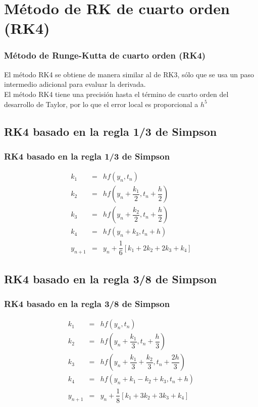 \section{M\'{e}todo de RK de cuarto orden (RK4)}
\begin{frame}
\frametitle{M\'{e}todo de Runge-Kutta de cuarto orden (RK4)}
El m\'{e}todo RK4 se obtiene de manera similar al de RK3, s\'{o}lo que se usa un paso intermedio adicional para evaluar la derivada.
\\
\medskip
El m\'{e}todo RK4 tiene una precisi\'{o}n hasta el t\'{e}rmino de cuarto orden del desarrollo de Taylor, por lo que el error local es proporcional a $h^{5}$
\end{frame}
\subsection{RK4 basado en la regla 1/3 de Simpson}
\begin{frame}
\frametitle{RK4 basado en la regla 1/3 de Simpson}
\begin{eqnarray*}
	k_{1} &=& hf(y_{n},t_{n}) \\
	k_{2} &=& hf(y_{n}+\dfrac{k_{1}}{2}, t_{n}+\dfrac{h}{2}) \\
	k_{3} &=& hf(y_{n}+\dfrac{k_{2}}{2},t_{n}+\dfrac{h}{2}) \\
	k_{4} &=& hf(y_{n}+k_{3}, t_{n}+h) \\
	y_{n+1} &=& y_{n}+\dfrac{1}{6}\left[k_{1}+2k_{2}+2k_{3}+k_{4} \right] 
\end{eqnarray*}
\end{frame}
\subsection{RK4 basado en la regla 3/8 de Simpson}
\begin{frame}
\frametitle{RK4 basado en la regla 3/8 de Simpson}
\begin{eqnarray*}
	k_{1} &=& hf(y_{n},t_{n}) \\
	k_{2} &=& hf(y_{n}+\dfrac{k_{1}}{3}, t_{n}+\dfrac{h}{3}) \\
	k_{3} &=& hf(y_{n}+\dfrac{k_{1}}{3}+\dfrac{k_{2}}{3},t_{n}+\dfrac{2h}{3}) \\
	k_{4} &=& hf(y_{n}+k_{1}-k_{2}+k_{3}, t_{n}+h) \\
	y_{n+1} &=& y_{n}+\dfrac{1}{8}\left[k_{1}+3k_{2}+3k_{3}+k_{4} \right] 
\end{eqnarray*}
\end{frame}
